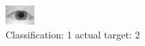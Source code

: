 \begin{figure}[h!]
\begin{center}
\includegraphics[width=0.60\columnwidth]{figures/ID979_class_1_target_2.png}
\end{center}
\caption{ Classification: 1 actual target: 2}
\label{fig:ID979_class_1_target_2}
\end{figure}
